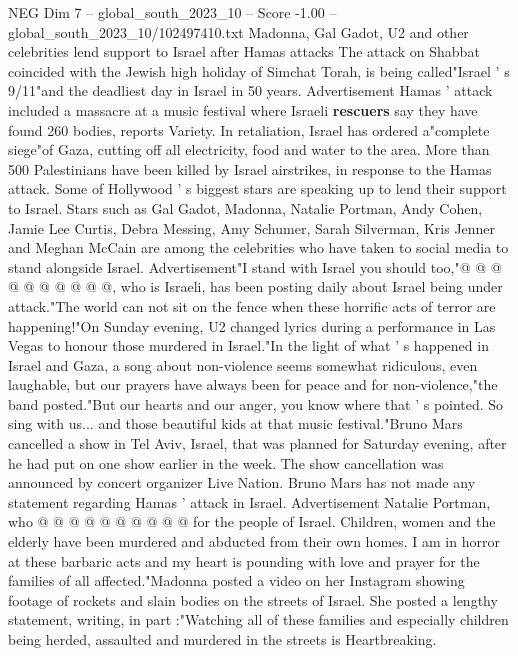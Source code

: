 \begin{textsample}{NEG Dim 7 – global\_south\_2023\_10 – Score -1.00 – global\_south\_2023\_10/102497410.txt}  \label{ex:f7_neg_063}
Madonna, Gal Gadot, U2 and other celebrities lend support to Israel after Hamas attacks The attack on Shabbat coincided with the Jewish high holiday of Simchat Torah, is being called"Israel ' s 9/11"and the deadliest day in Israel in 50 years.
Advertisement Hamas ' attack included a massacre at a music festival where Israeli \textbf{rescuers} say they have found 260 bodies, reports Variety.
In retaliation, Israel has ordered a"complete siege"of Gaza, cutting off all electricity, food and water to the area.
More than 500 Palestinians have been killed by Israel airstrikes, in response to the Hamas attack.
Some of Hollywood ' s biggest stars are speaking up to lend their support to Israel.
Stars such as Gal Gadot, Madonna, Natalie Portman, Andy Cohen, Jamie Lee Curtis, Debra Messing, Amy Schumer, Sarah Silverman, Kris Jenner and Meghan McCain are among the celebrities who have taken to social media to stand alongside Israel.
Advertisement"I stand with Israel you should too,"@ @ @ @ @ @ @ @ @ @, who is Israeli, has been posting daily about Israel being under attack."The world can not sit on the fence when these horrific acts of terror are happening!"On Sunday evening, U2 changed lyrics during a performance in Las Vegas to honour those murdered in Israel."In the light of what ' s happened in Israel and Gaza, a song about non-violence seems somewhat ridiculous, even laughable, but our prayers have always been for peace and for non-violence,"the band posted."But our hearts and our anger, you know where that ' s pointed.
So sing with us... and those beautiful kids at that music festival."Bruno Mars cancelled a show in Tel Aviv, Israel, that was planned for Saturday evening, after he had put on one show earlier in the week.
The show cancellation was announced by concert organizer Live Nation.
Bruno Mars has not made any statement regarding Hamas ' attack in Israel.
Advertisement Natalie Portman, who @ @ @ @ @ @ @ @ @ @ for the people of Israel.
Children, women and the elderly have been murdered and abducted from their own homes.
I am in horror at these barbaric acts and my heart is pounding with love and prayer for the families of all affected."Madonna posted a video on her Instagram showing footage of rockets and slain bodies on the streets of Israel.
She posted a lengthy statement, writing, in part :"Watching all of these families and especially children being herded, assaulted and murdered in the streets is Heartbreaking.

\end{textsample}
